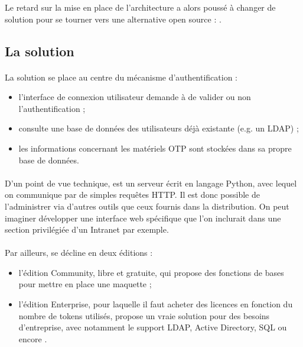Le retard sur la mise en place de l'architecture a alors poussé \asmile{} à changer de solution pour se tourner vers une alternative open source : \alinotp{}.


\subsection{La solution \alinotp{}}

\paragraph{}
La solution \alinotp{} se place au centre du mécanisme d'authentification :

\begin{itemize}
	\item l'interface de connexion utilisateur demande à \alinotp{} de valider ou non l'authentification ;
	\item \alinotp{} consulte une base de données des utilisateurs déjà existante (e.g. un LDAP) ;
	\item les informations concernant les matériels OTP sont stockées dans sa propre base de données.
\end{itemize}

\paragraph{}
D'un point de vue technique, \alinotp{} est un serveur écrit en langage Python, avec lequel on communique par de simples requêtes HTTP.
Il est donc possible de l'administrer via d'autres outils que ceux fournis dans la distribution.
On peut imaginer développer une interface web spécifique que l'on inclurait dans une section privilégiée d'un Intranet par exemple.

\paragraph{}
Par ailleurs, \alinotp{} se décline en deux éditions :

\begin{itemize}
	\item l'édition Community, libre et gratuite, qui propose des fonctions de bases pour mettre en place une maquette ;
	\item l'édition Enterprise, pour laquelle il faut acheter des licences en fonction du nombre de tokens utilisés, propose un vraie solution pour des besoins d'entreprise, avec notamment le support LDAP, Active Directory, SQL ou encore \afreerad{}.
\end{itemize}

